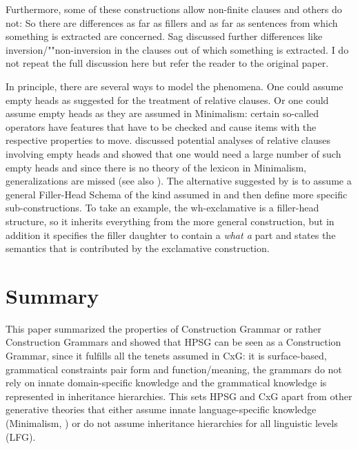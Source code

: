 \documentclass[output=paper]{langsci/langscibook}
\begin{document}
Furthermore, some of these constructions allow non-finite clauses and others do not:
\eal
{}
\zl
So there are differences as far as fillers and as far as sentences from which something is extracted
are concerned. Sag discussed further differences like inversion/""non-inversion in the clauses out of
which something is extracted. I do not repeat the full discussion here but refer the reader to the
original paper.

In principle, there are several ways to model the phenomena. One could assume empty
heads as \citet[Chapter~5]{ps2} suggested for the treatment of relative clauses. Or one could assume empty
heads as they are assumed in Minimalism: certain so-called operators have features that have to be
checked and cause items with the respective properties to move. \citet{Borsley2006a} discussed potential
analyses of relative clauses involving empty heads and showed that one would need a large number of
such empty heads and since there is no theory of the lexicon in Minimalism, generalizations are
missed (see also ). The alternative suggested by
\citet{Sag2010b} is to assume a general Filler-Head Schema of the kind assumed in  and
then define more specific sub-constructions. To take an example, the wh-exclamative is a filler-head
structure, so it inherits everything from the more general construction, but in addition it
specifies the filler daughter to contain a \emph{what a} part and states the semantics that is
contributed by the exclamative construction.


\section{Summary}
\label{sec-summary}

This paper summarized the properties of Construction Grammar or rather Construction Grammars and
showed that HPSG can be seen as a Construction Grammar, since it fulfills all the tenets assumed in
CxG: it is surface-based, grammatical constraints pair form and function/meaning, the grammars do
not rely on innate domain-specific knowledge and the grammatical knowledge is represented in
inheritance hierarchies. This sets HPSG and CxG apart from other generative theories that either
assume innate language-specific knowledge (Minimalism, \eg
\citealt{Chomsky2013a,Kayne94a-u,CR2010a}) or do not assume inheritance hierarchies for all linguistic levels (\eg LFG).
\end{document}
